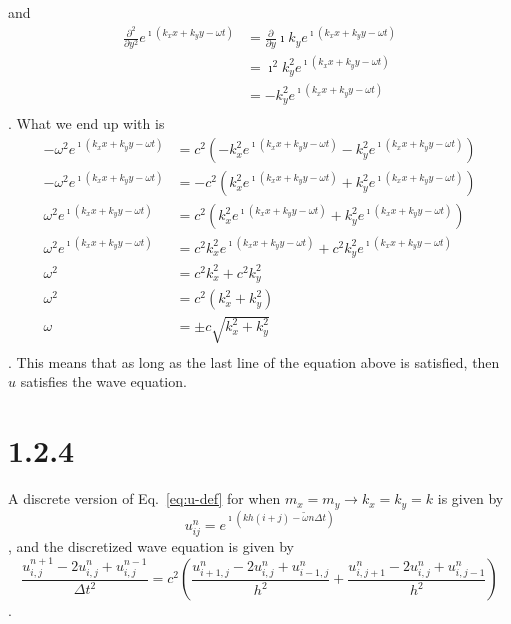 \documentclass[12pt, a4paper]{article}
\begin{document}
and
\begin{align*}
    \frac{\partial^2 }{\partial y^2} e^{ \imath (k_x x + k_y y - \omega t)} 
        &= \frac{\partial }{\partial y} \imath k_y e^{ \imath (k_x x + k_y y - \omega t)} \\ 
        &= \imath^2 k_y^2 e^{ \imath (k_x x + k_y y - \omega t)} \\ 
        &= - k_y^2 e^{ \imath (k_x x + k_y y - \omega t)} \\ 
\end{align*}.
What we end up with is
\begin{align*}
    - \omega^2 e^{ \imath (k_x x + k_y y - \omega t)} &= c^2 \left( - k_x^2 e^{ \imath (k_x x + k_y y - \omega t)}
        - k_y^2 e^{ \imath (k_x x + k_y y - \omega t)}\right) \\
    - \omega^2 e^{ \imath (k_x x + k_y y - \omega t)} &= - c^2 \left( k_x^2 e^{ \imath (k_x x + k_y y - \omega t)}
        + k_y^2 e^{ \imath (k_x x + k_y y - \omega t)}\right) \\
    \omega^2 e^{ \imath (k_x x + k_y y - \omega t)} &= c^2 \left( k_x^2 e^{ \imath (k_x x + k_y y - \omega t)}
        + k_y^2 e^{ \imath (k_x x + k_y y - \omega t)}\right) \\
    \omega^2 e^{ \imath (k_x x + k_y y - \omega t)} &= c^2 k_x^2 e^{ \imath (k_x x + k_y y - \omega t)}
        + c^2 k_y^2 e^{ \imath (k_x x + k_y y - \omega t)} \\
    \omega^2 &= c^2 k_x^2 + c^2 k_y^2 \\
    \omega^2 &= c^2 \left( k_x^2 + k_y^2 \right) \\
    \omega &= \pm c \sqrt{ k_x^2 + k_y^2 } \\
\end{align*}.
This means that as long as the last line of the equation above is satisfied, then
$u$ satisfies the wave equation.

\section{1.2.4}

A discrete version of Eq.~\ref{eq:u-def} for when $m_x = m_y \to k_x = k_y = k$
is given by
\begin{equation}
    u^n_{ij} = e^{\imath (kh(i+j) - \tilde{\omega} n \Delta t)}
    \label{eq:u-discrete}
\end{equation},
and the discretized wave equation is given by
\begin{equation}
    \frac{u^{n+1}_{i,j} - 2 u^n_{i,j} + u^{n-1}_{i,j}}{\Delta t^2} = c^2 \left(
        \frac{u^n_{i+1,j} - 2 u^n_{i,j} + u^n_{i-1,j}}{h^2}
        + \frac{u^n_{i,j+1} - 2 u^n_{i,j} + u^n_{i,j-1}}{h^2}
    \right)
    \label{eq:wave-discrete}
\end{equation}.
\end{document}
